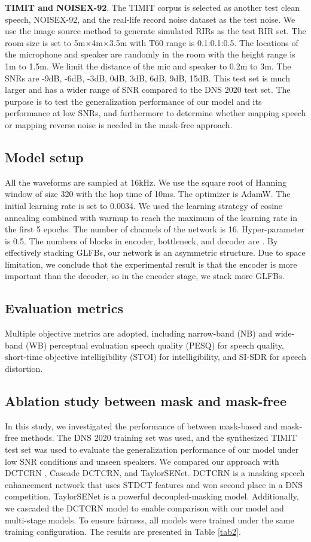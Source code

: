 \documentclass{INTERSPEECH2023}
\begin{document}
\textbf{TIMIT and NOISEX-92}. The TIMIT \cite{TIMITgarofolo1993darpa} corpus is selected as another test clean speech, NOISEX-92\cite{NOISEXvarga1993assessment}, and the real-life record noise dataset as the test noise. We use the image source method to generate simulated RIRs as the test RIR set. The room size is set to 5m×4m×3.5m with T60 range is 0.1:0.1:0.5. The locations of the microphone and speaker are randomly in the room with the height range is 1m to 1.5m. We limit the distance of the mic and speaker to 0.2m to 3m. The SNRs are -9dB, -6dB, -3dB, 0dB, 3dB, 6dB, 9dB, 15dB. This test set is much larger and has a wider range of SNR compared to the DNS 2020 test set. The purpose is to test the generalization performance of our model and its performance at low SNRs, and furthermore to determine whether mapping speech or mapping reverse noise is needed in the mask-free approach.

\subsection{Model setup}
All the waveforms are sampled at 16kHz. We use the square root of Hanning window of size 320 with the hop time of 10ms. The optimizer is AdamW. The initial learning rate is set to 0.0034. We used the learning strategy of cosine annealing combined with warmup to reach the maximum of the learning rate in the first 5 epochs. The number of channels of the network is 16. Hyper-parameter  is  0.5. The numbers of blocks in encoder, bottleneck, and decoder are . By effectively stacking GLFBs, our network is an asymmetric structure. Due to space limitation, we conclude that the experimental result is that the encoder is more important than the decoder, so in the encoder stage, we stack more GLFBs.

\subsection{Evaluation metrics}
Multiple objective metrics are adopted, including narrow-band (NB) and wide-band (WB) perceptual evaluation speech quality (PESQ)  for speech quality, short-time objective intelligibility (STOI) for intelligibility, and SI-SDR  for speech distortion. 


\subsection{Ablation study between mask and mask-free}
In this study, we investigated the performance of between mask-based and mask-free methods. The DNS 2020 training set was used, and the synthesized TIMIT test set was used to evaluate the generalization performance of our model under low SNR conditions and unseen speakers. We compared our approach with DCTCRN \cite{DCTCRN}, Cascade DCTCRN, and TaylorSENet. DCTCRN is a masking speech enhancement network that uses STDCT features and won second place in a DNS competition. TaylorSENet is a powerful decoupled-masking model. Additionally, we cascaded the DCTCRN model to enable comparison with our model and multi-stage models. To ensure fairness, all models were trained under the same training configuration. The results are presented in Table \ref{tab2}.
\end{document}
